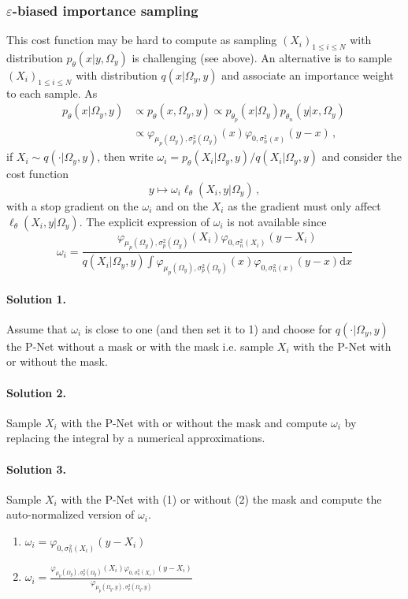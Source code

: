 \subsubsection{$\varepsilon$-biased importance sampling}
This cost function may be hard to compute as sampling $(X_i)_{1\leqslant i \leqslant N}$ with distribution $p_\theta(x|y,\Omega_y)$ is challenging (see above). An alternative is to sample $(X_i)_{1\leqslant i \leqslant N}$ with distribution $q(x|\Omega_y,y)$ and associate an importance weight to each sample. As
\begin{align*}
p_\theta(x|\Omega_y,y) &\propto p_\theta(x,\Omega_y,y) \propto p_{\theta_p}(x|\Omega_y)p_{\theta_n}(y|x,\Omega_y)\,\\
&\propto \varphi_{\mu_p(\Omega_y),\sigma^2_p(\Omega_y)}(x)   \varphi_{0,\sigma_n^2(x)}(y-x)\,,
\end{align*}
if $X_i \sim q(\cdot|\Omega_y,y)$, then write $\omega_i = p_\theta(X_i|\Omega_y,y)/q(X_i|\Omega_y,y)$ and consider the cost function
$$
y \mapsto \omega_i \ell_{\theta}(X_i,y|\Omega_y) \,,
$$
with a stop gradient on the $\omega_i$ and on the $X_i$ as the gradient must only affect $\ell_{\theta}(X_i,y|\Omega_y)$. The explicit expression of $\omega_i$ is not available since
$$
\omega_i = \frac{\varphi_{\mu_p(\Omega_y),\sigma^2_p(\Omega_y)}(X_i)   \varphi_{0,\sigma_n^2(X_i)}(y-X_i)}{q(X_i|\Omega_y,y) \int \varphi_{\mu_p(\Omega_y),\sigma^2_p(\Omega_y)}(x)   \varphi_{0,\sigma_n^2(x)}(y-x) \mathrm{d} x}
$$
\paragraph{Solution 1.} Assume that $\omega_i$ is close to one (and then set it to 1) and choose for $q(\cdot|\Omega_y,y)$ the P-Net without a mask or with the mask i.e. sample $X_i$ with the P-Net with or without the mask.

\paragraph{Solution 2.} Sample $X_i$ with the P-Net with or without the mask and compute $\omega_i$ by replacing the integral by a numerical approximations.

\paragraph{Solution 3.} Sample $X_i$ with the P-Net with (1) or without (2) the mask and compute the auto-normalized version of $\omega_i$.
\begin{enumerate}
\item $\omega_i = \varphi_{0,\sigma_n^2(X_i)}(y-X_i)$
\item $\omega_i = \frac{ \varphi_{\mu_p(\Omega_y),\sigma^2_p(\Omega_y)}(X_i)   \varphi_{0,\sigma_n^2(X_i)}(y-X_i)}{\varphi_{\mu_p(\Omega_y,y),\sigma^2_p(\Omega_y,y)}}$
\end{enumerate}


